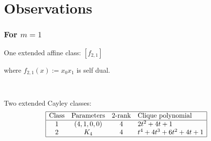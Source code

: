 \documentclass[pdf,sprung,slideColor,nocolorBG]{beamer}
\begin{document}
\section{Observations}
\begin{frame}
\frametitle{For $m=1$}

One extended affine class: $[f_{2,1}]$ 

where $f_{2,1}(x) := x_0 x_1$ is self dual.

~

Two extended Cayley classes:
\begin{align*}
\begin{array}{|cccl|}
\hline
\text{Class} &
\text{Parameters} & 
\text{2-rank} &
\text{Clique polynomial}
\\
\hline
1 &
(4, 1, 0, 0) & 4 & 
2t^{2} + 4t + 1
\\
2 &
K_4 & 4 & 
t^{4} + 4t^{3} + 6t^{2} + 4t + 1
\\
\hline
\end{array}
\end{align*}

\end{frame}
\end{document}
